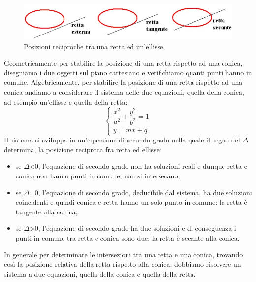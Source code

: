 \begin{figure}[htbp]
  \centering
  \includegraphics[width=\textwidth]{img/rettaconica.jpg}
  \caption{Posizioni reciproche tra una retta ed un'ellisse.}%
\end{figure}
Geometricamente per stabilire la posizione di una retta rispetto ad una 
conica, disegniamo i due oggetti sul piano cartesiano e verifichiamo quanti 
punti hanno in comune. Algebricamente, per stabilire la posizione di una 
retta rispetto ad una conica andiamo a considerare il sistema delle due 
equazioni, quella della conica, ad esempio un'ellisse e quella della 
retta:
\[\begin{cases}  \dfrac{x^{2}}{a^{2}}+\dfrac{y^{2}}{b^{2}}=1   \\ y=mx+q  
\end{cases}\]
Il sistema si sviluppa in un'equazione di secondo grado nella quale il 
segno del $\Delta$ determina, la posizione reciproca fra retta ed ellisse:

\begin{itemize} [noitemsep]
  \item se $\Delta$<0, l'equazione di secondo grado non ha soluzioni 
reali e dunque retta e conica non hanno punti in comune, non si intersecano;
  \item se $\Delta$=0, l'equazione di secondo grado, deducibile dal 
sistema, ha due soluzioni coincidenti e quindi conica e retta hanno un solo 
punto in comune: la retta è tangente alla conica;
  \item se $\Delta$>0, l'equazione di secondo grado ha due soluzioni 
e di conseguenza i punti in comune tra retta e conica sono due: la retta è 
secante alla conica.
\end{itemize}

In generale per determinare le intersezioni tra una retta e una conica, 
trovando così la posizione relativa della retta rispetto alla conica, 
dobbiamo risolvere un sistema a due equazioni, quella della conica e quella 
della retta. 

